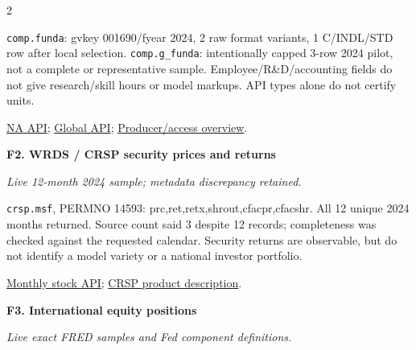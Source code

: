\documentclass[10pt,a4paper,landscape]{article}
\newcommand{\code}[1]{{\footnotesize\texttt{#1}}}
\begin{document}
\begin{multicols}{2}
\begin{minipage}{\linewidth}
\code{comp.funda}: gvkey 001690/fyear 2024, 2 raw format variants, 1 C/INDL/STD row after local selection. \code{comp.g\_funda}: intentionally capped 3-row 2024 pilot, not a complete or representative sample. Employee/R\&D/accounting fields do not give research/skill hours or model markups. API types alone do not certify units.

\par \href{https://wrds-api.wharton.upenn.edu/data/comp.funda/}{NA API}; \href{https://wrds-api.wharton.upenn.edu/data/comp.g_funda/}{Global API}; \href{https://wrds-www.wharton.upenn.edu/pages/grid-items/introduction-compustat-part-1/}{Producer/access overview}.

\end{minipage}\par\vspace{6pt}

\noindent\begin{minipage}{\linewidth}\raggedright

\hypertarget{src-F2}{\textbf{F2. WRDS / CRSP security prices and returns}}\par

{\footnotesize\itshape Live 12-month 2024 sample; metadata discrepancy retained.}\par

\code{crsp.msf}, PERMNO 14593: prc,ret,retx,shrout,cfacpr,cfacshr. All 12 unique 2024 months returned. Source count said 3 despite 12 records; completeness was checked against the requested calendar. Security returns are observable, but do not identify a model variety or a national investor portfolio.

\par \href{https://wrds-api.wharton.upenn.edu/data/crsp.msf/}{Monthly stock API}; \href{https://www.crsp.org/research__trashed/crsp-us-stock-databases/}{CRSP product description}.

\end{minipage}\par\vspace{6pt}

\noindent\begin{minipage}{\linewidth}\raggedright

\hypertarget{src-F3}{\textbf{F3. International equity positions}}\par

{\footnotesize\itshape Live exact FRED samples and Fed component definitions.}\par


\end{minipage}
\end{multicols}
\end{document}
